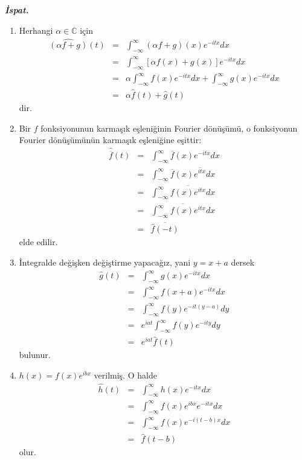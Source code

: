 \documentclass[a4paper, 10pt]{article}
\begin{document}
\textit{\textbf{İspat.}} 
\begin{enumerate}
	\item Herhangi $\alpha \in \mathbb{C}$ için 
	\begin{eqnarray*}
	\widehat{(\alpha f+g)}(t) &=& \int_{-\infty }^{\infty } (\alpha f + g)(x) e^{-itx}dx \\
	&=& \int_{-\infty }^{\infty } \left[ \alpha f(x) + g(x)\right]  e^{-itx}dx \\
	&=& \alpha \int_{-\infty }^{\infty } f(x) e^{-itx}dx + \int_{-\infty }^{\infty } g(x) e^{-itx}dx \\
	&=& \alpha \widehat{f}(t) + \widehat{g}(t) 	
	\end{eqnarray*}
dir.
	\item  Bir $f$ fonksiyonunun karmaşık eşleniğinin Fourier dönüşümü, o fonksiyonun Fourier dönüşümünün karmaşık eşleniğine eşittir:
		\begin{eqnarray*}
		\widehat{\overline{f}}(t)  &=&  \int_{-\infty }^{\infty } \overline{f}(x) e^{-itx}dx  \\ &=&  \int_{-\infty }^{\infty } \overline{f}(x) \overline{e^{itx}}dx\\ &=& \int_{-\infty }^{\infty } \overline{f(x)e^{itx}} dx \\ &=& \overline{\int_{-\infty }^{\infty } f(x)e^{itx} dx} \\ &=& \overline{\widehat{f}(-t)}  
		\end{eqnarray*}
	elde edilir.
	
	\item İntegralde değişken değiştirme yapacağız, yani $y=x+a$ dersek
		\begin{eqnarray*}
		\widehat{g}(t)  &=&  \int_{-\infty }^{\infty } g(x) e^{-itx}dx  \\ &=&  \int_{-\infty }^{\infty } {f}(x+a) e^{-itx}dx\\ &=& \int_{-\infty }^{\infty } f(y)e^{-it(y-a)} dy \\ &=& e^{iat}\int_{-\infty }^{\infty } f(y)e^{-ity} dy \\ &=& e^{iat}\widehat{f}(t)  
		\end{eqnarray*}
		bulunur.
		
	\item $h(x)=f(x)e^{ibx}$ verilmiş. O halde
		\begin{eqnarray*}
		\widehat{h}(t)  &=&  \int_{-\infty }^{\infty } h(x) e^{-itx}dx  \\ &=&  \int_{-\infty }^{\infty } {f}(x)e^{ibx} e^{-itx}dx\\ &=& \int_{-\infty }^{\infty } f(x)e^{-i(t-b)x} dx \\ &=& \widehat{f}(t-b)  
		\end{eqnarray*}
		olur.


\end{enumerate}
\end{document}
